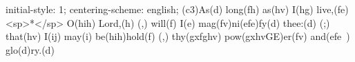 initial-style: 1;
centering-scheme: english;
(c3)As(d) long(fh) as(hv) I(hg) live,(fe) <sp>*</sp> O(hih) Lord,(h) (,) will(f) I(e) mag(fv)ni(efe)fy(d) thee:(d) (;) that(hv) I(ij) may(i) be(hih)hold(f) (,) thy(gxfghv) pow(gxhvGE)er(fv) and(efe~) glo(d)ry.(d)
